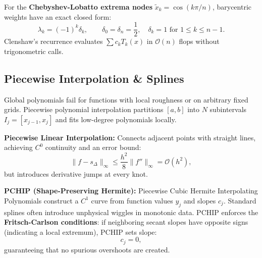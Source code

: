 For the \textbf{Chebyshev-Lobatto extrema nodes} $\tilde{x}_k = \cos(k\pi/n)$, barycentric weights have an exact closed form:
\begin{equation}
    \lambda_k = (-1)^k \delta_k, \qquad \delta_0 = \delta_n = \frac{1}{2}, \quad \delta_k = 1 \text{ for } 1 \le k \le n-1.
\end{equation}
Clenshaw's recurrence evaluates $\sum c_k T_k(x)$ in $\mathcal{O}(n)$ flops without trigonometric calls.

\subsection{Piecewise Interpolation \& Splines}

Global polynomials fail for functions with local roughness or on arbitrary fixed grids. Piecewise polynomial interpolation partitions $[a, b]$ into $N$ subintervals $I_j = [x_{j-1}, x_j]$ and fits low-degree polynomials locally.

\textbf{Piecewise Linear Interpolation:} Connects adjacent points with straight lines, achieving $C^0$ continuity and an error bound:
\begin{equation}
    \|f - s_\Delta\|_\infty \le \frac{h^2}{8} \|f''\|_\infty = \mathcal{O}(h^2),
\end{equation}
but introduces derivative jumps at every knot.

\textbf{PCHIP (Shape-Preserving Hermite):} Piecewise Cubic Hermite Interpolating Polynomials construct a $C^1$ curve from function values $y_j$ and slopes $c_j$. Standard splines often introduce unphysical wiggles in monotonic data. PCHIP enforces the \textbf{Fritsch-Carlson conditions}: if neighboring secant slopes have opposite signs (indicating a local extremum), PCHIP sets slope:
\begin{equation}
    c_j = 0,
\end{equation}
guaranteeing that no spurious overshoots are created.

